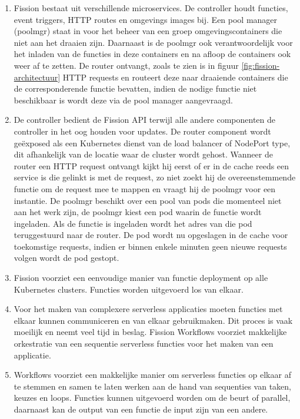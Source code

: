 \begin{enumerate}
    \item Fission bestaat uit verschillende microservices. De controller houdt functies, event triggers, HTTP routes en omgevings images bij. Een pool manager (poolmgr) staat in voor het beheer van een groep omgevingscontainers die niet aan het draaien zijn. Daarnaast is de poolmgr ook verantwoordelijk voor het inladen van de functies in deze containers en na afloop de containers ook weer af te zetten. De router ontvangt, zoals te zien is in figuur \ref{fig:fission-architectuur} HTTP requests en routeert deze naar draaiende containers die de corresponderende functie bevatten, indien de nodige functie niet beschikbaar is wordt deze via de pool manager aangevraagd. \autocite{Chemitiganti2018}
    \item De controller bedient de Fission API terwijl alle andere componenten de controller in het oog houden voor updates. De router component wordt geëxposed als een Kubernetes dienst van de load balancer of NodePort type, dit afhankelijk van de locatie waar de cluster wordt gehost. Wanneer de router een HTTP request ontvangt kijkt hij eerst of er in de cache reeds een service is die gelinkt is met de request, zo niet zoekt hij de overeenstemmende functie om de request mee te mappen en vraagt hij de poolmgr voor een instantie. De poolmgr beschikt over een pool van pods die momenteel niet aan het werk zijn, de poolmgr kiest een pod waarin de functie wordt ingeladen. Als de functie is ingeladen wordt het adres van die pod teruggestuurd naar de router. De pod wordt nu opgeslagen in de cache voor toekomstige requests, indien er binnen enkele minuten geen nieuwe requests volgen wordt de pod gestopt.  \autocite{Chemitiganti2018}
    \item Fission voorziet een eenvoudige manier van functie deployment op alle Kubernetes clusters. Functies worden uitgevoerd los van elkaar.
    \item Voor het maken van complexere serverless applicaties moeten functies met elkaar kunnen communiceren en van elkaar gebruikmaken. Dit proces is vaak moeilijk en neemt veel tijd in beslag. Fission Workflows voorziet makkelijke orkestratie van een sequentie serverless functies voor het maken van een applicatie. \autocite{Chemitiganti2018}
    \item Workflows voorziet een makkelijke manier om serverless functies op elkaar af te stemmen en samen te laten werken aan de hand van sequenties van taken, keuzes en loops. Functies kunnen uitgevoerd worden om de beurt of parallel, daarnaast kan de output van een functie de input zijn van een andere. \autocite{Chemitiganti2018}

\end{enumerate}
